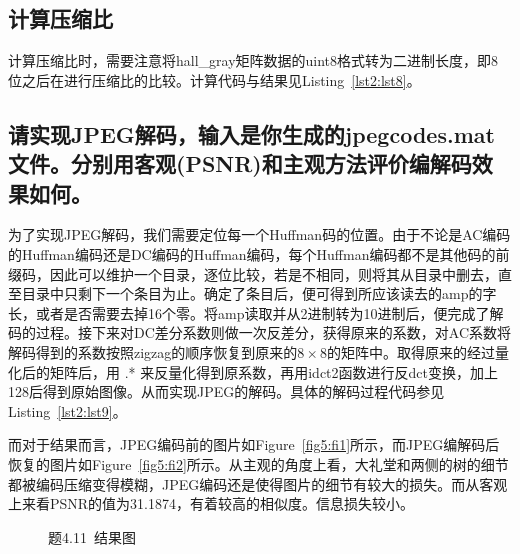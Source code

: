 \documentclass[a4paper]{article}
\begin{document}
		\subsection{计算压缩比}
		
		计算压缩比时，需要注意将hall\_gray矩阵数据的uint8格式转为二进制长度，即8位之后在进行压缩比的比较。计算代码与结果见Listing~\ref{lst2:lst8}。
		
		
		\subsection{请实现JPEG解码，输入是你生成的jpegcodes.mat文件。分别用客观(PSNR)和主观方法评价编解码效果如何。}
		
		为了实现JPEG解码，我们需要定位每一个Huffman码的位置。由于不论是AC编码的Huffman编码还是DC编码的Huffman编码，每个Huffman编码都不是其他码的前缀码，因此可以维护一个目录，逐位比较，若是不相同，则将其从目录中删去，直至目录中只剩下一个条目为止。确定了条目后，便可得到所应该读去的amp的字长，或者是否需要去掉16个零。将amp读取并从2进制转为10进制后，便完成了解码的过程。接下来对DC差分系数则做一次反差分，获得原来的系数，对AC系数将解码得到的系数按照zigzag的顺序恢复到原来的$ 8 \times 8 $的矩阵中。取得原来的经过量化后的矩阵后，用 .* 来反量化得到原系数，再用idct2函数进行反dct变换，加上128后得到原始图像。从而实现JPEG的解码。具体的解码过程代码参见Listing~\ref{lst2:lst9}。
		
		
		
		而对于结果而言，JPEG编码前的图片如Figure~\ref{fig5:fi1}所示，而JPEG编解码后恢复的图片如Figure~\ref{fig5:fi2}所示。从主观的角度上看，大礼堂和两侧的树的细节都被编码压缩变得模糊，JPEG编码还是使得图片的细节有较大的损失。而从客观上来看PSNR的值为31.1874，有着较高的相似度。信息损失较小。
		
		\begin{figure}[h]
			\centering
			\hspace{0.75cm}
			\caption{题4.11~结果图}
			\label{fig5}
		\end{figure}
		
\end{document}
